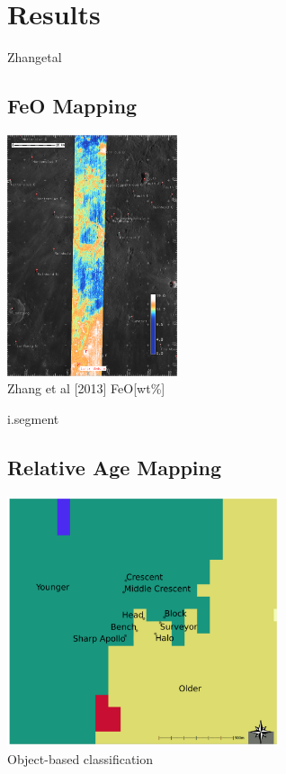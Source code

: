 \documentclass[unknownkeysallowed,xcolor=dvipsnames,beamer]{beamer} %
\begin{document}
\section{Results}
\begin{frame}[fragile]{Zhangetal}
\subsection{FeO Mapping}
\begin{center}
  \includegraphics[width=5cm]{images/fig7}\\
  Zhang et al [2013] FeO[wt\%]
  \end{center}
\end{frame}

\begin{frame}[fragile]{i.segment}
\subsection{Relative Age Mapping}
\begin{center}
  \includegraphics[width=8cm]{images/fig6}\\
  Object-based classification
  \end{center}
\end{frame}
\end{document}
